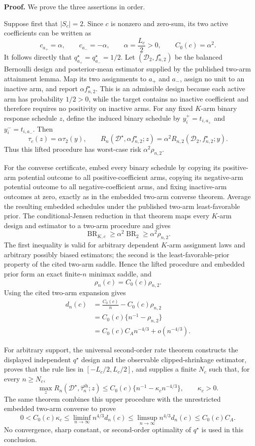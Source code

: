 \textbf{Proof.}
We prove the three assertions in order.

Suppose first that \(|S_c|=2\).  Since \(c\) is nonzero and zero-sum, its two active coefficients can be written as
\[
 c_{a_+}=\alpha,
 \qquad c_{a_-}=-\alpha,
 \qquad
 \alpha=\frac{L_c}{2}>0,
 \qquad
 C_0(c)=\alpha^2.
\]
It follows directly that \(q_{a_+}^\star=q_{a_-}^\star=1/2\).  Let \((\mathcal D_2,f_{n,2}^\star)\) be the balanced Bernoulli design and posterior-mean estimator supplied by the published two-arm attainment lemma.  Map its two assignments to \(a_+\) and \(a_-\), assign no unit to an inactive arm, and report \(\alpha f_{n,2}^\star\).  This is an admissible design because each active arm has probability \(1/2>0\), while the target contains no inactive coefficient and therefore requires no positivity on inactive arms.  For any fixed \(K\)-arm binary response schedule \(z\), define the induced binary schedule by \(y_i^+=t_{i,a_+}\) and \(y_i^-=t_{i,a_-}\).  Then
\[
 \tau_c(z)=\alpha\tau_2(y),
 \qquad
 R_n(\mathcal D^\star,\alpha f_{n,2}^\star;z)
 =\alpha^2R_{n,2}(\mathcal D_2,f_{n,2}^\star;y).
\]
Thus this lifted procedure has worst-case risk \(\alpha^2\rho_{n,2}\).

For the converse certificate, embed every binary schedule by copying its positive-arm potential outcome to all positive-coefficient arms, copying its negative-arm potential outcome to all negative-coefficient arms, and fixing inactive-arm outcomes at zero, exactly as in the embedded two-arm converse theorem.  Average the resulting embedded schedules under the published two-arm least-favorable prior.  The conditional-Jensen reduction in that theorem maps every \(K\)-arm design and estimator to a two-arm procedure and gives
\[
 \operatorname{BR}_{K,c}
 \geq \alpha^2\operatorname{BR}_{2}
 \geq \alpha^2\rho_{n,2}.
\]
The first inequality is valid for arbitrary dependent \(K\)-arm assignment laws and arbitrary possibly biased estimators; the second is the least-favorable-prior property of the cited two-arm saddle.  Hence the lifted procedure and embedded prior form an exact finite-\(n\) minimax saddle, and
\[
 \rho_n(c)=C_0(c)\rho_{n,2}.
\]
Using the cited two-arm expansion gives
\[
 \begin{aligned}
 d_n(c)
 &=\frac{C_0(c)}n-C_0(c)\rho_{n,2}\\
 &=C_0(c)\{n^{-1}-\rho_{n,2}\}\\
 &=C_0(c)C_A n^{-4/3}+o(n^{-4/3}).
 \end{aligned}
\]

For arbitrary support, the universal second-order rate theorem constructs the displayed independent \(q^\star\) design and the observable clipped-shrinkage estimator, proves that the rule lies in \([-L_c/2,L_c/2]\), and supplies a finite \(N_c\) such that, for every \(n\geq N_c\),
\[
 \max_zR_n(\mathcal D^\star,\widehat\tau_n^{\mathrm{sh}};z)
 \leq C_0(c)\{n^{-1}-\kappa_cn^{-4/3}\},
 \qquad \kappa_c>0.
\]
The same theorem combines this upper procedure with the unrestricted embedded two-arm converse to prove
\[
 0<C_0(c)\kappa_c
 \leq\liminf_{n\to\infty}n^{4/3}d_n(c)
 \leq\limsup_{n\to\infty}n^{4/3}d_n(c)
 \leq C_0(c)C_A.
\]
No convergence, sharp constant, or second-order optimality of \(q^\star\) is used in this conclusion.

